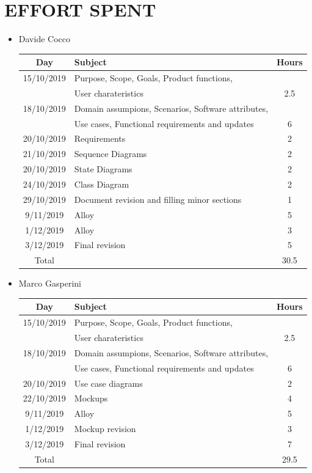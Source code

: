 \documentclass[12pt,a4paper]{article}
\begin{document}
\section{EFFORT SPENT}
\begin{itemize}
\item {Davide Cocco}
 \begin{center}
			\begin{tabular}{| c | l | c |}
				\hline
				\textbf{Day} & \textbf{Subject} & \textbf{Hours} \\ \hline
				15/10/2019 & Purpose, Scope, Goals, Product functions,&\\
				&User charateristics & 2.5 \\ \hline
				18/10/2019 & Domain assumpions, Scenarios, Software attributes,&\\
				& Use cases, Functional requirements and updates  & 6\\ \hline
				20/10/2019 & Requirements  & 2\\	\hline
				21/10/2019 & Sequence Diagrams  & 2\\ \hline
				20/10/2019 & State Diagrams  & 2\\ \hline
				24/10/2019 & Class Diagram  & 2\\ \hline
				29/10/2019 & Document revision and filling minor sections & 1\\ \hline
				9/11/2019 & Alloy & 5\\ \hline
				1/12/2019 & Alloy & 3\\ \hline
				3/12/2019 & Final revision & 5\\ \hline
				Total & & 30.5 \\ \hline
			\end{tabular}
		\end{center}
\item {Marco Gasperini}
\begin{center}
			\begin{tabular}{| c | l | c |}
				\hline
				\textbf{Day} & \textbf{Subject} & \textbf{Hours} \\ \hline
				15/10/2019 & Purpose, Scope, Goals, Product functions,&\\
				&User charateristics & 2.5 \\ \hline
				18/10/2019 & Domain assumpions, Scenarios, Software attributes,&\\
				& Use cases, Functional requirements and updates  & 6\\ \hline
				20/10/2019 & Use case diagrams & 2\\ \hline
				22/10/2019 & Mockups & 4\\ \hline	
				9/11/2019 & Alloy & 5\\ \hline
				1/12/2019 & Mockup revision & 3\\ \hline
				3/12/2019 & Final revision & 7\\ \hline
				Total & & 29.5 \\ \hline
			\end{tabular}
\end{center}
\end{itemize}
\end{document}
